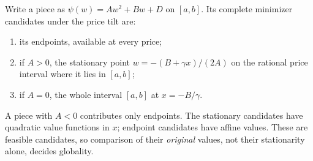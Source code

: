 Write a piece as $\psi(w)=Aw^2+Bw+D$ on $[a,b]$. Its complete minimizer
candidates under the price tilt are:
\begin{enumerate}
\item its endpoints, available at every price;
\item if $A>0$, the stationary point $w=-(B+\gamma x)/(2A)$ on the rational
price interval where it lies in $[a,b]$;
\item if $A=0$, the whole interval $[a,b]$ at $x=-B/\gamma$.
\end{enumerate}
A piece with $A<0$ contributes only endpoints. The stationary candidates have
quadratic value functions in $x$; endpoint candidates have affine values.
These are feasible candidates, so comparison of their \emph{original} values,
not their stationarity alone, decides globality.

